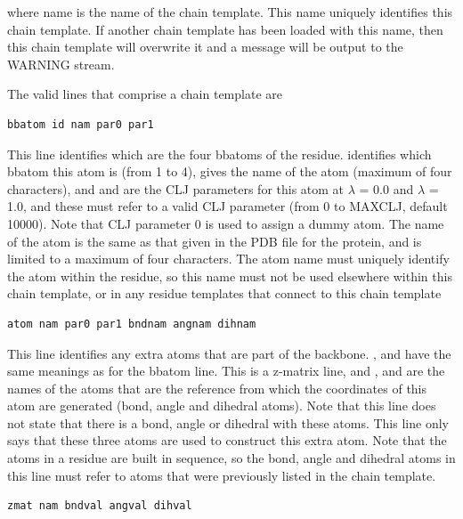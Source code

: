 \documentclass[letterpaper,10pt,english]{sphinxmanual}
\begin{document}
where name is the name of the chain template. This name uniquely identifies this chain template. If another chain template has been loaded with this name, then this chain template will overwrite it and a message will be output to the WARNING stream.

The valid lines that comprise a chain template are

\begin{Verbatim}[frame=single,commandchars=\\\{\}]
bbatom id nam par0 par1
\end{Verbatim}

This line identifies which are the four bbatoms of the residue.  identifies which bbatom this atom is (from 1 to 4),  gives the name of the atom (maximum of four characters), and  and  are the CLJ parameters for this atom at \(\lambda\) = 0.0 and \(\lambda\) = 1.0, and these must refer to a valid CLJ parameter (from 0 to MAXCLJ, default 10000). Note that CLJ parameter 0 is used to assign a dummy atom. The name of the atom is the same as that given in the PDB file for the protein, and is limited to a maximum of four characters. The atom name must uniquely identify the atom within the residue, so this name must not be used elsewhere within this chain template, or in any residue templates that connect to this chain template

\begin{Verbatim}[frame=single,commandchars=\\\{\}]
atom nam par0 par1 bndnam angnam dihnam
\end{Verbatim}

This line identifies any extra atoms that are part of the backbone. ,  and  have the same meanings as for the bbatom line. This is a z-matrix line, and ,  and  are the names of the atoms that are the reference from which the coordinates of this atom are generated (bond, angle and dihedral atoms). Note that this line does not state that there is a bond, angle or dihedral with these atoms. This line only says that these three atoms are used to construct this extra atom. Note that the atoms in a residue are built in sequence, so the bond, angle and dihedral atoms in this line must refer to atoms that were previously listed in the chain template.

\begin{Verbatim}[frame=single,commandchars=\\\{\}]
zmat nam bndval angval dihval
\end{Verbatim}
\end{document}
